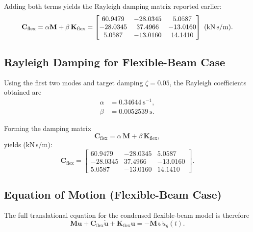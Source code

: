 \documentclass[12pt,a4paper]{article}
\newcommand{\mat}[1]{\mathbf{#1}}
\newcommand{\vect}[1]{\mathbf{#1}}
\begin{document}
Adding both terms yields the Rayleigh damping matrix reported earlier:
\begin{equation}
  \mat{C}_{\text{flex}} = \alpha\mat{M} + \beta\,\mat{K}_{\text{flex}} = \begin{bmatrix}60.9479 & -28.0345 & 5.0587\\-28.0345 & 37.4966 & -13.0160\\5.0587 & -13.0160 & 14.1410\end{bmatrix}~(\text{kN\,s/m}).
\end{equation}

\subsection{Rayleigh Damping for Flexible-Beam Case}
Using the first two modes and target damping $\zeta=0.05$, the Rayleigh coefficients obtained are
\begin{align}
  \alpha &= 0.34644~\text{s}^{-1},\\
  \beta  &= 0.0052539~\text{s}.
\end{align}

Forming the damping matrix
\begin{equation}
  \mat{C}_{\text{flex}} = \alpha\,\mat{M} + \beta\,\mat{K}_{\text{flex}},
\end{equation}
yields (kN\,s/m):
\begin{equation}
  \mat{C}_{\text{flex}} = \begin{bmatrix}60.9479 & -28.0345 & 5.0587\\-28.0345 & 37.4966 & -13.0160\\5.0587 & -13.0160 & 14.1410\end{bmatrix}.
\end{equation}

\subsection{Equation of Motion (Flexible-Beam Case)}
The full translational equation for the condensed flexible-beam model is therefore
\begin{equation}
  \mat{M}\ddot{\vect{u}} + \mat{C}_{\text{flex}}\dot{\vect{u}} + \mat{K}_{\text{flex}}\vect{u} = -\mat{M}\,\bm{\iota}\,\ddot{u}_g(t).
\end{equation}
\end{document}
